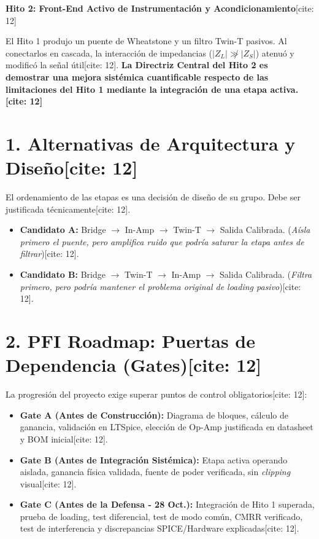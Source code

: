 \documentclass[11pt, a4paper]{article}
\begin{document}
\begin{center}
    \Large\textbf{\textcolor{ucbblue}{Hito 2: Front-End Activo de Instrumentación y Acondicionamiento}}[cite: 12]
\end{center}

\begin{tcolorbox}[colback=yellow!5, colframe=ucbblue, title=\textbf{Definición del Problema Sistémico[cite: 12]}]
    \raggedright
    El Hito 1 produjo un puente de Wheatstone y un filtro Twin-T pasivos. Al conectarlos en cascada, la interacción de impedancias ($|Z_L| \not\gg |Z_S|$) atenuó y modificó la señal útil[cite: 12].
    \textbf{La Directriz Central del Hito 2 es demostrar una mejora sistémica cuantificable respecto de las limitaciones del Hito 1 mediante la integración de una etapa activa.[cite: 12]}
\end{tcolorbox}

\section*{1. Alternativas de Arquitectura y Diseño[cite: 12]}
El ordenamiento de las etapas es una decisión de diseño de su grupo. Debe ser justificada técnicamente[cite: 12].
\begin{itemize}
    \item \textbf{Candidato A:} Bridge $\rightarrow$ In-Amp $\rightarrow$ Twin-T $\rightarrow$ Salida Calibrada. (\textit{Aísla primero el puente, pero amplifica ruido que podría saturar la etapa antes de filtrar})[cite: 12].
    \item \textbf{Candidato B:} Bridge $\rightarrow$ Twin-T $\rightarrow$ In-Amp $\rightarrow$ Salida Calibrada. (\textit{Filtra primero, pero podría mantener el problema original de loading pasivo})[cite: 12].
\end{itemize}

\section*{2. PFI Roadmap: Puertas de Dependencia (Gates)[cite: 12]}
La progresión del proyecto exige superar puntos de control obligatorios[cite: 12]:
\begin{itemize}
    \item \textbf{Gate A (Antes de Construcción):} Diagrama de bloques, cálculo de ganancia, validación en LTSpice, elección de Op-Amp justificada en datasheet y BOM inicial[cite: 12].
    \item \textbf{Gate B (Antes de Integración Sistémica):} Etapa activa operando aislada, ganancia física validada, fuente de poder verificada, sin \textit{clipping} visual[cite: 12].
    \item \textbf{Gate C (Antes de la Defensa - 28 Oct.):} Integración de Hito 1 superada, prueba de loading, test diferencial, test de modo común, CMRR verificado, test de interferencia y discrepancias SPICE/Hardware explicadas[cite: 12].
\end{itemize}
\end{document}
